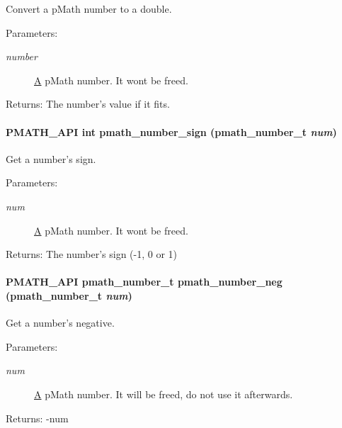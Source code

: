 Convert a pMath number to a double. 

\begin{Desc}
\item[Parameters:]
\begin{description}
\item[{\em number}]\hyperlink{class_a}{A} pMath number. It wont be freed. \end{description}
\end{Desc}
\begin{Desc}
\item[Returns:]The number's value if it fits. \end{Desc}
\hypertarget{group__numbers_g7a736f04d207d140b3b052438cc371d0}{
\paragraph[{pmath\_\-number\_\-sign}]{\setlength{\rightskip}{0pt plus 5cm}PMATH\_\-API int pmath\_\-number\_\-sign ({\bf pmath\_\-number\_\-t} {\em num})}\hfill}
\label{group__numbers_g7a736f04d207d140b3b052438cc371d0}


Get a number's sign. 

\begin{Desc}
\item[Parameters:]
\begin{description}
\item[{\em num}]\hyperlink{class_a}{A} pMath number. It wont be freed. \end{description}
\end{Desc}
\begin{Desc}
\item[Returns:]The number's sign (-1, 0 or 1) \end{Desc}
\hypertarget{group__numbers_gfbfb5ee7f7cd966432e1cee6fa5b6bf5}{
\paragraph[{pmath\_\-number\_\-neg}]{\setlength{\rightskip}{0pt plus 5cm}PMATH\_\-API {\bf pmath\_\-number\_\-t} pmath\_\-number\_\-neg ({\bf pmath\_\-number\_\-t} {\em num})}\hfill}
\label{group__numbers_gfbfb5ee7f7cd966432e1cee6fa5b6bf5}


Get a number's negative. 

\begin{Desc}
\item[Parameters:]
\begin{description}
\item[{\em num}]\hyperlink{class_a}{A} pMath number. It will be freed, do not use it afterwards. \end{description}
\end{Desc}
\begin{Desc}
\item[Returns:]-num \end{Desc}
